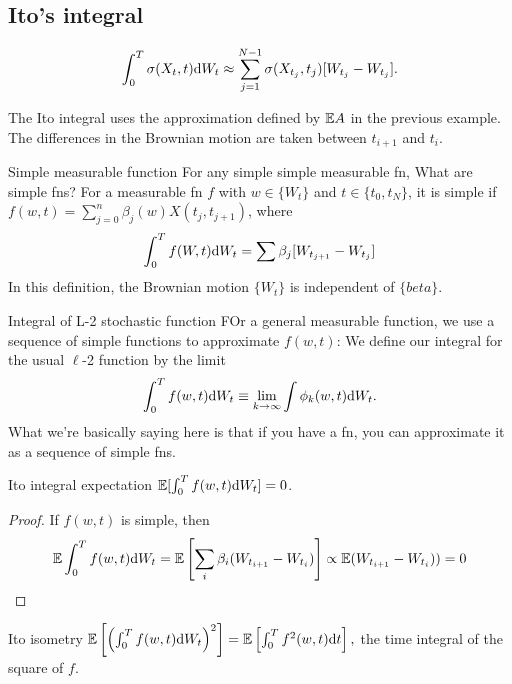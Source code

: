\subsection{Ito's integral}

\[ \int_0^T \sigma(X_t, t) \text{d} W_t  
	\approx \sum_{j=1}^{N-1}
	\sigma(X_{t_j}, t_j) [W_{t_j} - W_{t_j}].
\]

The Ito integral uses the approximation defined by $\mathbb{E} A$ in the previous example. The differences in the Brownian motion are taken between $t_{i+1}$ and $t_i$. 

\begin{definition}{Simple measurable function}{}
For any simple simple measurable fn, \textemdash What are simple fns?
For a measurable fn $f$ with  $w\in \{W_t\}$ and $t\in\{t_0, t_N\}$,  it is simple if
$f(w, t)= \sum_{j=0}^n \beta_j (w) X(t_j, t_{j+1}) $, where 
\[ \int_0^T f(W, t) \text{d} W_t = \sum \beta_j [W_{t_{j+1}} - W_{t_j}] \]
In this definition, the Brownian motion $\{W_t\}$ is independent of $\{beta\}$. 
\end{definition}

\begin{definition}{Integral of L-2 stochastic function}{}
FOr a general measurable function, we use a sequence of simple functions to approximate $f(w, t)$:  We define our integral for the usual $\ell$-2 function by the limit 
\[ \int_0^T f(w, t) \text{d} W_t 
	\equiv \lim_{k\to\infty} \int \phi_k (w, t) \text{d} W_t.  \]
What we're basically saying here is that if you have a fn, you can approximate it as a sequence of simple fns.
\end{definition} 

\begin{theorem}{Ito integral expectation}{}
$\mathbb{E} [\int_0^T f(w, t) \text{d} W_t] = 0$.
\end{theorem}

\begin{proof}
If $f(w, t)$ is simple, then 
\[ \mathbb{E} \int_0^T f(w, t) \text{d} W_t  
	= \mathbb{E} \left[ \sum_i \beta_i (W_{t_{i+1}} - W_{t_i})  \right] 
	\propto \mathbb{E} (W_{t_{i+1}} - W_{t_i})  ) 
	= 0 \]
\end{proof}

\begin{theorem}{Ito isometry}{}
$ \mathbb{E} \left[  \left( \int_0^T f(w, t) \text{d} W_t \right)^2 \right] = \mathbb{E} \left[ \int_0^T  f^2(w, t) \text{d} t \right] ,$ the time integral of the square of $f$. 
\end{theorem}


